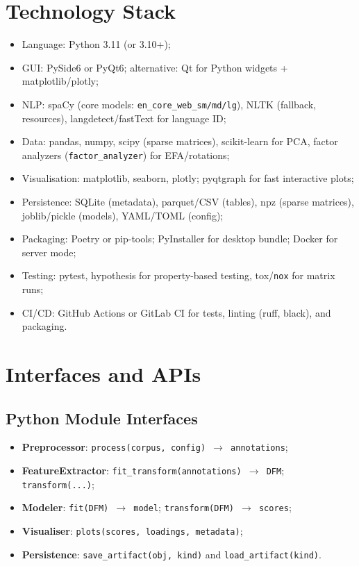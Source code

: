 \section{Technology Stack}
\begin{itemize}
    \item Language: Python 3.11 (or 3.10+);
    \item GUI: PySide6 or PyQt6; alternative: Qt for Python widgets + matplotlib/plotly;
    \item NLP: spaCy (core models: \texttt{en\_core\_web\_sm/md/lg}), NLTK (fallback, resources), langdetect/fastText for language ID;
    \item Data: pandas, numpy, scipy (sparse matrices), scikit-learn for PCA, factor analyzers (\texttt{factor\_analyzer}) for EFA/rotations;
    \item Visualisation: matplotlib, seaborn, plotly; pyqtgraph for fast interactive plots;
    \item Persistence: SQLite (metadata), parquet/CSV (tables), npz (sparse matrices), joblib/pickle (models), YAML/TOML (config);
    \item Packaging: Poetry or pip-tools; PyInstaller for desktop bundle; Docker for server mode;
    \item Testing: pytest, hypothesis for property-based testing, tox/\texttt{nox} for matrix runs;
    \item CI/CD: GitHub Actions or GitLab CI for tests, linting (ruff, black), and packaging.
\end{itemize}

\section{Interfaces and APIs}
\subsection{Python Module Interfaces}
\begin{itemize}
    \item \textbf{Preprocessor}: \texttt{process(corpus, config) $\rightarrow$ annotations};
    \item \textbf{FeatureExtractor}: \texttt{fit\_transform(annotations) $\rightarrow$ DFM}; \texttt{transform(...)};
    \item \textbf{Modeler}: \texttt{fit(DFM) $\rightarrow$ model}; \texttt{transform(DFM) $\rightarrow$ scores};
    \item \textbf{Visualiser}: \texttt{plots(scores, loadings, metadata)};
    \item \textbf{Persistence}: \texttt{save\_artifact(obj, kind)} and \texttt{load\_artifact(kind)}.
\end{itemize}

